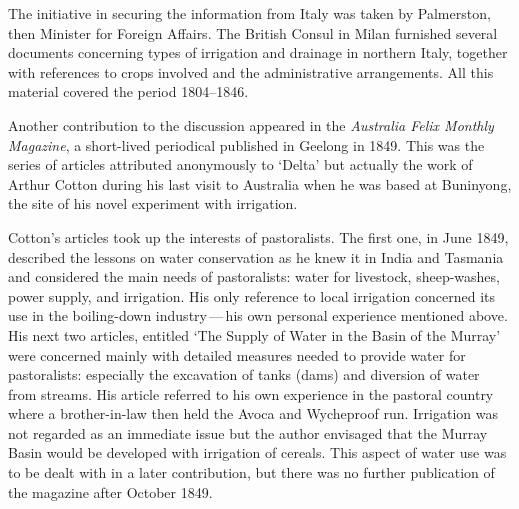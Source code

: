 The initiative in securing the information from Italy 
was taken by Palmerston, then Minister for Foreign Affairs.  The
British Consul in Milan furnished several documents concerning
types of irrigation and drainage in northern Italy,
together with references to crops involved and the administrative
arrangements.  All this material covered the period 1804--1846.

Another contribution to the discussion appeared in the
\textit{Australia Felix Mo\-nthly Magazine}, a short-lived periodical
published in Geelong in 1849.  This was the series of articles
attributed anonymously to `Delta' but actually the work of Arthur
Cotton during his last visit to Australia when he
was based at Buninyong,  the site of his novel
experiment with irrigation.

Cotton's articles took up the interests of
pastoralists.  The first one, in June 1849,
described the lessons on water conservation as he knew it in India
 and Tasmania  and considered the main
needs of pastoralists: water for livestock, sheep-washes, power
supply, and irrigation.  His only reference to local irrigation
concerned its use in the boiling-down industry\,---\,his own personal
experience mentioned above.  His next two articles, entitled `The
Supply of Water in the Basin of the Murray' were concerned mainly with
detailed measures needed to provide water for pastoralists: especially
the excavation of tanks (dams) and diversion of
water from streams.  His article referred to his own experience in the
pastoral country where a brother-in-law then held the Avoca and
Wycheproof run. Irrigation was not regarded as an immediate issue but
the author envisaged that the Murray Basin would be developed with
irrigation of cereals.  This aspect of water use was
to be dealt with in a later contribution, but there was no further
publication of the magazine after October
1849.

